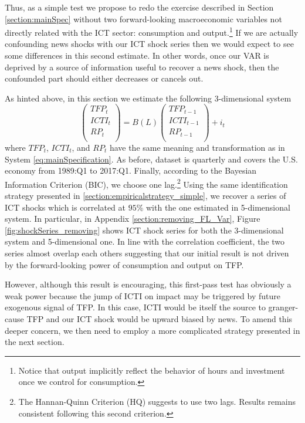\documentclass[12pt]{article}
\begin{document}
Thus, as a simple test we propose to redo the exercise described in Section \ref{section:mainSpec} without two forward-looking macroeconomic variables not directly related with the ICT sector: consumption and output.\footnote{Notice that output implicitly reflect the behavior of hours and investment once we control for consumption.} If we are actually confounding news shocks with our ICT shock series then we would expect to see some differences in this second estimate. In other words, once our VAR is deprived by a source of information useful to recover a news shock, then the confounded part should either decreases or cancels out. 

As hinted above, in this section we estimate the following 3-dimensional system
\begin{equation}\label{eq:noForVariables}
\begin{pmatrix}
TFP_t \\ 
ICTI_t \\
RP_t \\
\end{pmatrix} = B(L) \begin{pmatrix}
TFP_{t-1} \\ 
ICTI_{t-1} \\
RP_{t-1} \\
\end{pmatrix} + i_t
\end{equation}
where  $TFP_t$, $ICTI_{t}$, and $RP_t$ have the same meaning and transformation as in System \ref{eq:mainSpecification}. As before, dataset is quarterly and covers the U.S. economy from 1989:Q1 to 2017:Q1. Finally, according to the Bayesian Information Criterion (BIC), we choose one lag.\footnote{The Hannan-Quinn Criterion (HQ) suggests to use two lags. Results remains consistent following this second criterion.} Using the same identification strategy presented in \ref{section:empiricalstrategy_simple}, we recover a series of ICT shocks which is correlated at $95$\% with the one estimated in 5-dimensional system. In particular, in Appendix \ref{section:removing_FL_Var}, Figure \ref{fig:shockSeries_removing} shows ICT shock series for both the 3-dimensional system and 5-dimensional one. In line with the correlation coefficient, the two series almost overlap each others suggesting that our initial result is not driven by the forward-looking power of consumption and output on TFP. 

However, although this result is encouraging, this first-pass test has obviously a weak power because the jump of ICTI on impact may be triggered by future exogenous signal of TFP. In this case, ICTI would be itself the source to granger-cause TFP and our ICT shock would be upward biased by news. To amend this deeper concern, we then need to employ a more complicated strategy presented in the next section. 
\end{document}
